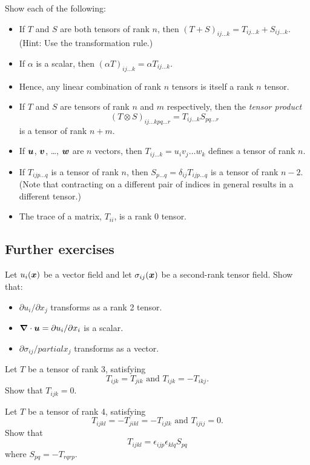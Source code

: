 \documentclass{article}
\begin{document}
Show each of the following:
\begin{itemize}
\item If $T$ and $S$ are both tensors of rank $n$, then $(T+S)_{ij\dots k} = T_{ij\dots k} + S_{ij\dots k}$. (Hint: Use the transformation rule.)
\item If $\alpha$ is a scalar, then $(\alpha T)_{ij\dots k} = \alpha T_{ij\dots k}$.
\item Hence, any linear combination of rank $n$ tensors is itself a rank $n$ tensor.
\item If $T$ and $S$ are tensors of rank $n$ and $m$ respectively, then the
\textit{tensor product} 
$$ (T\otimes S)_{ij\dots kpq\dots r} = T_{ij\dots k} S_{pq\dots r} $$
is a tensor of rank $n+m$.
\item If $\boldsymbol{u}$, $\boldsymbol{v}$, \dots, $\boldsymbol{w}$ are $n$ vectors, then $T_{ij\dots k} = u_i v_j \dots w_k $ defines a tensor of rank $n$.
\item If $T_{ijp\dots q}$ is a tensor of rank $n$, then $S_{p\dots q} =
\delta_{ij} T_{ijp\dots q}$ is a tensor of rank $n-2$. (Note that contracting on
a different pair of indices in general results in a different tensor.)
\item The trace of a matrix, $T_{ii}$, is a rank 0 tensor.
\end{itemize}

\subsection{Further exercises}

Let $u_i(\boldsymbol{x})$ be a vector field and let $\sigma_{ij}(\boldsymbol{x})$ be a
second-rank tensor field. Show that:
\begin{itemize}
\item $\partial u_i/\partial x_j$ transforms as a rank 2 tensor.
\item $\boldsymbol{\nabla}\cdot\boldsymbol{u} = \partial u_i/\partial x_i$ is a scalar.
\item $\partial \sigma_{ij}/partial x_j$ transforms as a vector.
\end{itemize}

Let $T$ be a tensor of rank 3, satisfying
$$ T_{ijk} = T_{jik} \text{ and } T_{ijk} = -T_{ikj}. $$
Show that $T_{ijk} = 0$.

Let $T$ be a tensor of rank 4, satisfying 
$$ T_{ijkl} = -T_{jikl} = -T_{ijlk} \text{ and } T_{ijij} = 0. $$
Show that
$$ T_{ijkl} = \epsilon_{ijp}\epsilon_{klq} S_{pq} $$
where $ S_{pq} = -T_{rqrp} $.
\end{document}
